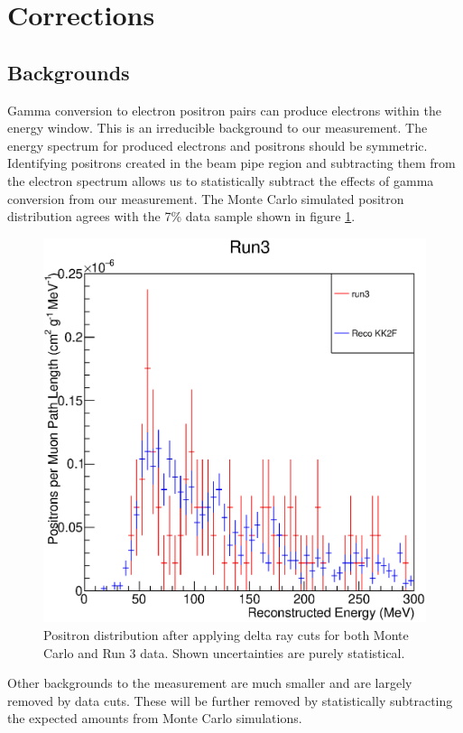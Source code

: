 \section{\deltaray Corrections}
\label{sec:corr}
\subsection{Backgrounds}
	Gamma conversion to electron positron pairs can produce electrons within the energy window. This is an irreducible background to our measurement. The energy spectrum for produced electrons and positrons should be symmetric. Identifying positrons created in the beam pipe region and subtracting them from the electron spectrum allows us to statistically subtract the effects of gamma conversion from our measurement. The Monte Carlo simulated positron distribution agrees with the 7\% data sample shown in figure 
	\ref{fig:posdist}.
	\begin{figure}[htb]
		\centering
		\includegraphics[scale=0.5]{figures/posdist.eps}
		\caption{Positron distribution after applying delta ray cuts for both Monte Carlo and Run 3 data. Shown uncertainties are purely statistical.}
		\label{fig:posdist}
	\end{figure}	
	
	Other backgrounds to the measurement are much smaller and are largely removed by data cuts. These will be further removed by statistically subtracting the expected amounts from Monte Carlo simulations.

